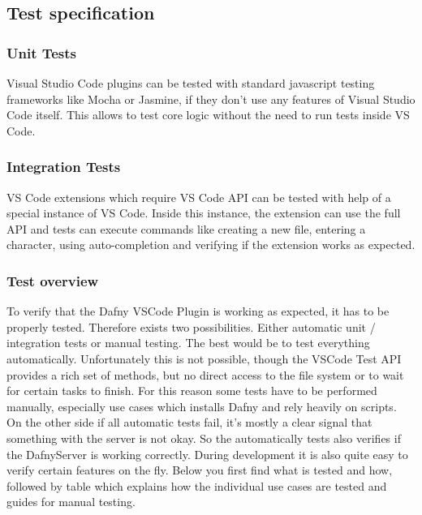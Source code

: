 \subsection{Test specification}

\subsubsection{Unit Tests}
Visual Studio Code plugins can be tested with standard javascript testing frameworks like Mocha or Jasmine, if they don't use any features of Visual Studio Code itself. This allows to test core logic without the need to run tests inside VS Code.

\subsubsection{Integration Tests}
VS Code extensions which require VS Code API can be tested with help of a special instance of VS Code. Inside this instance, the extension can use the full API and tests can execute commands like creating a new file, entering a character, using auto-completion and verifying if the extension works as expected.   

\subsubsection{Test overview}
To verify that the Dafny VSCode Plugin is working as expected, it has to be properly tested. Therefore exists two possibilities. Either automatic unit / integration tests or manual testing. The best would be to test everything automatically. Unfortunately this is not possible, though the VSCode Test API provides a rich set of methods, but no direct access to the file system or to wait for certain tasks to finish. For this reason some tests have to be performed manually, especially use cases which installs Dafny and rely heavily on scripts. On the other side if all automatic tests fail, it's mostly a clear signal that something with the server is not okay. So the automatically tests also verifies if the DafnyServer is working correctly. During development it is also quite easy to verify certain features on the fly. 
Below you first find what is tested and how, followed by table which explains how the individual use cases are tested and guides for manual testing. 


